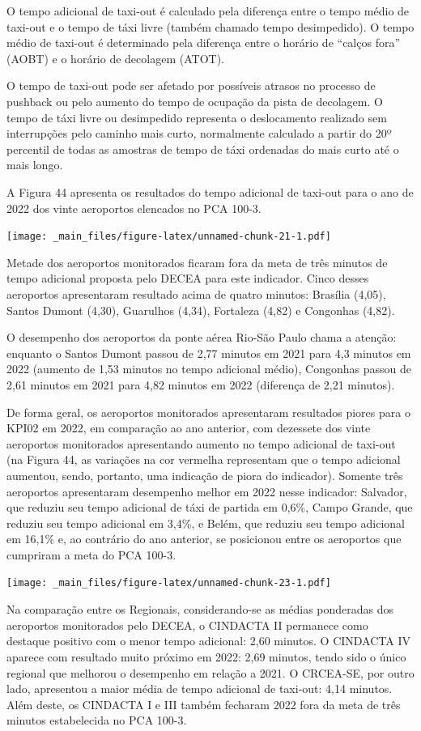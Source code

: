 \documentclass[
]{book}
\begin{document}
O tempo adicional de taxi-out é calculado pela diferença entre o tempo médio de taxi-out e o tempo de táxi livre (também chamado tempo desimpedido). O tempo médio de taxi-out é determinado pela diferença entre o horário de ``calços fora'' (AOBT) e o horário de decolagem (ATOT).

O tempo de taxi-out pode ser afetado por possíveis atrasos no processo de pushback ou pelo aumento do tempo de ocupação da pista de decolagem. O tempo de táxi livre ou desimpedido representa o deslocamento realizado sem interrupções pelo caminho mais curto, normalmente calculado a partir do 20º percentil de todas as amostras de tempo de táxi ordenadas do mais curto até o mais longo.

A Figura 44 apresenta os resultados do tempo adicional de taxi-out para o ano de 2022 dos vinte aeroportos elencados no PCA 100-3.

\texttt{[image: \_main\_files/figure-latex/unnamed-chunk-21-1.pdf]}

Metade dos aeroportos monitorados ficaram fora da meta de três minutos de tempo adicional proposta pelo DECEA para este indicador. Cinco desses aeroportos apresentaram resultado acima de quatro minutos: Brasília (4,05), Santos Dumont (4,30), Guarulhos (4,34), Fortaleza (4,82) e Congonhas (4,82).

O desempenho dos aeroportos da ponte aérea Rio-São Paulo chama a atenção: enquanto o Santos Dumont passou de 2,77 minutos em 2021 para 4,3 minutos em 2022 (aumento de 1,53 minutos no tempo adicional médio), Congonhas passou de 2,61 minutos em 2021 para 4,82 minutos em 2022 (diferença de 2,21 minutos).

De forma geral, os aeroportos monitorados apresentaram resultados piores para o KPI02 em 2022, em comparação ao ano anterior, com dezessete dos vinte aeroportos monitorados apresentando aumento no tempo adicional de taxi-out (na Figura 44, as variações na cor vermelha representam que o tempo adicional aumentou, sendo, portanto, uma indicação de piora do indicador). Somente três aeroportos apresentaram desempenho melhor em 2022 nesse indicador: Salvador, que reduziu seu tempo adicional de táxi de partida em 0,6\%, Campo Grande, que reduziu seu tempo adicional em 3,4\%, e Belém, que reduziu seu tempo adicional em 16,1\% e, ao contrário do ano anterior, se posicionou entre os aeroportos que cumpriram a meta do PCA 100-3.

\texttt{[image: \_main\_files/figure-latex/unnamed-chunk-23-1.pdf]}

Na comparação entre os Regionais, considerando-se as médias ponderadas dos aeroportos monitorados pelo DECEA, o CINDACTA II permanece como destaque positivo com o menor tempo adicional: 2,60 minutos. O CINDACTA IV aparece com resultado muito próximo em 2022: 2,69 minutos, tendo sido o único regional que melhorou o desempenho em relação a 2021. O CRCEA-SE, por outro lado, apresentou a maior média de tempo adicional de taxi-out: 4,14 minutos. Além deste, os CINDACTA I e III também fecharam 2022 fora da meta de três minutos estabelecida no PCA 100-3.
\end{document}
